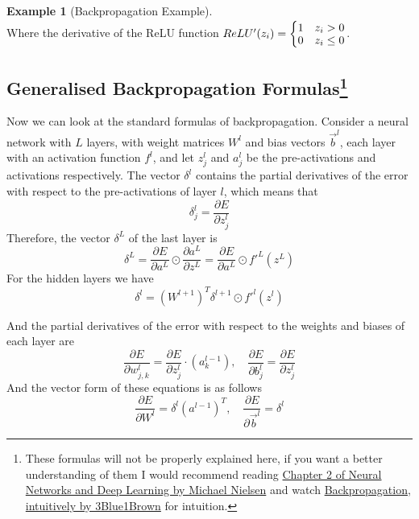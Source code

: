 \documentclass[a4paper]{article}
\theoremstyle{definition}
\newtheorem{example}{Example}
\begin{document}
\begin{example}[Backpropagation Example]
\begin{equation}
    \end{equation}
    Where the derivative of the ReLU function $ReLU'(z_i) = \begin{cases} 1 & z_i > 0 \vspace{-3pt} \\ 0 & z_i \leq 0 \end{cases}$.
\end{example}
\noindent

\subsection[Generalised Backpropagation Formulas]{Generalised Backpropagation Formulas\footnote{These formulas will not be properly explained here, if you want a better understanding of them I would recommend reading \href{http://neuralnetworksanddeeplearning.com/chap2.html}{Chapter 2 of Neural Networks and Deep Learning by Michael Nielsen} and watch \href{https://youtu.be/Ilg3gGewQ5U?si=vHY4JfwTyA1r0Q89}{Backpropagation, intuitively by 3Blue1Brown} for intuition.}}
Now we can look at the standard formulas of backpropagation.
Consider a neural network with $L$ layers, with weight matrices $W^l$ and bias vectors $\vec{b}^l$, each layer with an activation function $f^l$, and let $z^l_{j}$ and $a^l_{j}$ be the pre-activations and activations respectively.
The vector $\delta^l$ contains the partial derivatives of the error with respect to the pre-activations of layer $l$, which means that
\begin{equation}
    \delta^l_j = \frac{\partial E}{\partial z^l_j}
\end{equation}
\noindent
Therefore, the vector $\delta^L$ of the last layer is
\begin{equation}
    \delta^L = \frac{\partial E}{\partial a^L} \odot \frac{\partial a^L}{\partial z^L} = \frac{\partial E}{\partial a^L} \odot f'^L(z^L)
\end{equation}
For the hidden layers we have
\begin{equation}
    \delta^l = (W^{l+1})^T \delta^{l+1} \odot f'^l(z^l)
\end{equation}

\noindent
And the partial derivatives of the error with respect to the weights and biases of each layer are
\begin{equation*}
    \frac{\partial E}{\partial w^l_{j,k}} = \frac{\partial E}{\partial z^l_{j}} \cdot (a^{l-1}_{k}), \quad \frac{\partial E}{\partial b^l_{j}} = \frac{\partial E}{\partial z^l_{j}}
\end{equation*}
And the vector form of these equations is as follows
\begin{equation*}
    \frac{\partial E}{\partial W^l} = \delta^l (a^{l-1})^T, \quad \frac{\partial E}{\partial \vec{b}^l} = \delta^l
\end{equation*}
\end{document}
